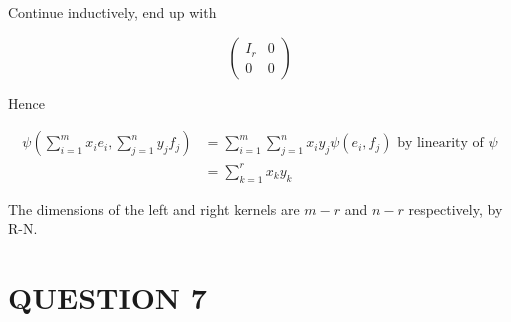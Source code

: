 \documentclass[a4paper]{article}
\begin{document}
Continue inductively, end up with

\[ \begin{pmatrix}
I_{r} & 0 \\
0 & 0
\end{pmatrix} \]

Hence


\begin{align*}
\psi( \sum_{i=1}^{m}  x_{i}e_{i}  , \sum_{j=1}^{n}  y_{j} f_{j} ) & = \sum_{i=1}^{m} \sum_{j=1}^{n}  x_{i} y_{j} \psi(e_{i},f_{j}) \text{ by linearity of } \psi \\
& = \sum_{k=1}^{r} x_{k}y_{k} 
\end{align*}

The dimensions of the left and right kernels are $ m - r $ and $ n - r $ respectively, by R-N.


\section{QUESTION 7}
\end{document}
